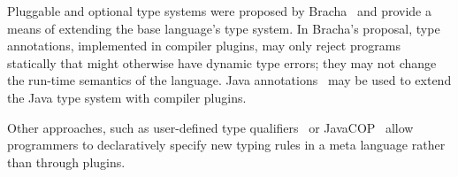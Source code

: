 Pluggable and optional type systems were proposed by
Bracha~\cite{bracha04-pluggable} and provide a means of
extending the base language's type system.
In Bracha's proposal, type annotations, implemented in compiler plugins,
may only reject programs statically that might otherwise have dynamic
type errors; they may not change the run-time semantics of the
language.
Java annotations~\cite{Java3,jsr308}
may be used to extend the Java type system with compiler plugins.

Other approaches, such as user-defined type
qualifiers~\cite{foster-popl02,chin05-qualifiers}
or JavaCOP~\cite{javacop-oopsla06}
allow programmers to 
declaratively specify new typing rules in a meta language rather
than through plugins.


